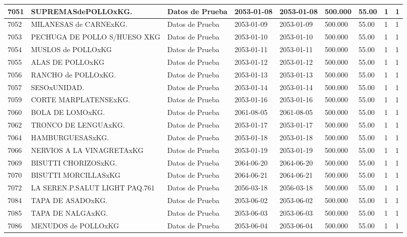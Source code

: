 \documentclass[a4paper,12pt]{article}
\begin{document}
\begin{landscape}
\begin{longtable}{|p{4cm}|p{2.5cm}|p{2.5cm}|p{1.8cm}|p{1.8cm}|p{1cm}|p{1cm}|p{3cm}|p{3cm}||}
7051 & SUPREMASdePOLLOxKG. & Datos de Prueba & 2053-01-08 & 2053-01-08 & 500.000 & 55.00 & 1 & 1 \\ \hline 
7052 & MILANESAS de CARNExKG. & Datos de Prueba & 2053-01-09 & 2053-01-09 & 500.000 & 55.00 & 1 & 1 \\ \hline 
7053 & PECHUGA DE POLLO S/HUESO XKG & Datos de Prueba & 2053-01-10 & 2053-01-10 & 500.000 & 55.00 & 1 & 1 \\ \hline 
7054 & MUSLOS de POLLOxKG & Datos de Prueba & 2053-01-11 & 2053-01-11 & 500.000 & 55.00 & 1 & 1 \\ \hline 
7055 & ALAS DE POLLOxKG & Datos de Prueba & 2053-01-12 & 2053-01-12 & 500.000 & 55.00 & 1 & 1 \\ \hline 
7056 & RANCHO de POLLOxKG. & Datos de Prueba & 2053-01-13 & 2053-01-13 & 500.000 & 55.00 & 1 & 1 \\ \hline 
7057 & SESOxUNIDAD. & Datos de Prueba & 2053-01-14 & 2053-01-14 & 500.000 & 55.00 & 1 & 1 \\ \hline 
7059 & CORTE MARPLATENSExKG. & Datos de Prueba & 2053-01-16 & 2053-01-16 & 500.000 & 55.00 & 1 & 1 \\ \hline 
7060 & BOLA DE LOMOxKG. & Datos de Prueba & 2061-08-05 & 2061-08-05 & 500.000 & 55.00 & 1 & 1 \\ \hline 
7062 & TRONCO DE LENGUAxKG. & Datos de Prueba & 2053-01-17 & 2053-01-17 & 500.000 & 55.00 & 1 & 1 \\ \hline 
7064 & HAMBURGUESASxKG. & Datos de Prueba & 2053-01-18 & 2053-01-18 & 500.000 & 55.00 & 1 & 1 \\ \hline 
7066 & NERVIOS A LA VINAGRETAxKG & Datos de Prueba & 2053-01-19 & 2053-01-19 & 500.000 & 55.00 & 1 & 1 \\ \hline 
7069 & BISUTTI CHORIZOSxKG. & Datos de Prueba & 2064-06-20 & 2064-06-20 & 500.000 & 55.00 & 1 & 1 \\ \hline 
7070 & BISUTTI MORCILLASxKG & Datos de Prueba & 2064-06-21 & 2064-06-21 & 500.000 & 55.00 & 1 & 1 \\ \hline 
7072 & LA SEREN.P.SALUT LIGHT PAQ.761 & Datos de Prueba & 2056-03-18 & 2056-03-18 & 500.000 & 55.00 & 1 & 1 \\ \hline 
7084 & TAPA DE ASADOxKG. & Datos de Prueba & 2053-06-02 & 2053-06-02 & 500.000 & 55.00 & 1 & 1 \\ \hline 
7085 & TAPA DE NALGAxKG. & Datos de Prueba & 2053-06-03 & 2053-06-03 & 500.000 & 55.00 & 1 & 1 \\ \hline 
7086 & MENUDOS de POLLOxKG & Datos de Prueba & 2053-06-04 & 2053-06-04 & 500.000 & 55.00 & 1 & 1 \\ \hline 

\end{longtable}
\end{landscape}
\end{document}
